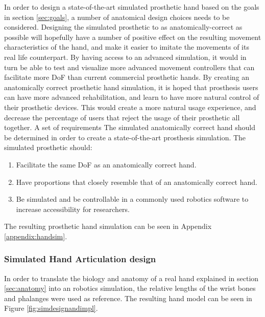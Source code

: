 \documentclass[../main.tex]{subfiles}
\begin{document}
In order to design a state-of-the-art simulated prosthetic hand based on the goals in section \ref{sec:goals}, a number of anatomical design choices needs to be considered.
Designing the simulated prosthetic to as anatomically-correct as possible will hopefully have a number of positive effect on the resulting movement characteristics of the hand, and make it easier to imitate the movements of its real life counterpart.
By having access to an advanced simulation, it would in turn be able to test and visualize more advanced movement controllers that can facilitate more DoF than current commercial prosthetic hands. 
By creating an anatomically correct prosthetic hand simulation, it is hoped that prosthesis users can have more advanced rehabilitation, and learn to have more natural control of their prosthetic devices.
This would create a more natural usage experience, and decrease the percentage of users that reject the usage of their prosthetic all together.
A set of requirements The simulated anatomically correct hand should be determined in order to create a state-of-the-art prosthesis simulation.
The simulated prosthetic should:

\begin{enumerate}
\item Facilitate the same DoF as an anatomically correct hand.
\item Have proportions that closely resemble that of an anatomically correct hand.
\item Be simulated and be controllable in a commonly used robotics software to increase accessibility for researchers.
\end{enumerate}

The resulting prosthetic hand simulation can be seen in Appendix \ref{appendix:handsim}.

\newpage
\subsubsection{Simulated Hand Articulation design}

In order to translate the biology and anatomy of a real hand explained in section \ref{sec:anatomy} into an robotics simulation, the relative lengths of the wrist bones and phalanges were used as reference.
The resulting hand model can be seen in Figure \ref{fig:simdesignandimpl}.
\end{document}
